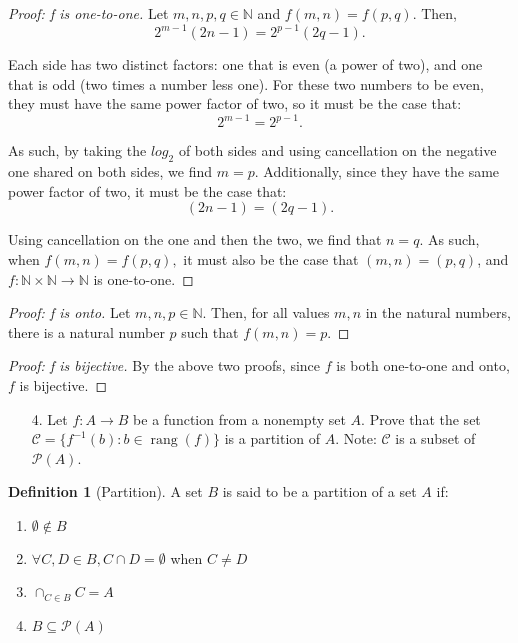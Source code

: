 \documentclass[10pt]{article}
\theoremstyle{definition}
\newtheorem{definition}[equation]{Definition}
\theoremstyle{plain}
\newcommand{\N}{\mathbb{N}}
\DeclareMathOperator\rang{rang}
\begin{document}
\begin{proof}[Proof: f is one-to-one]
  Let $m,n,p,q\in\N$ and $f(m,n)=f(p,q)$. Then,
  $$2^{m-1}(2n-1)=2^{p-1}(2q-1).$$

  Each side has two distinct factors: one that is even (a power of two), and one that is odd (two times a number less one). For these two numbers to be even, they must have the same power factor of two, so it must be the case that:
  $$2^{m-1}=2^{p-1}.$$

  As such, by taking the $log_2$ of both sides and using cancellation on the negative one shared on both sides, we find $m=p$. Additionally, since they have the same power factor of two, it must be the case that:
  $$(2n-1)=(2q-1).$$

  Using cancellation on the one and then the two, we find that $n=q$. As such, when $f(m,n)=f(p,q),$ it must also be the case that $(m,n)=(p,q)$, and $f: \N \times \N \to \N$ is one-to-one.
\end{proof}
\begin{proof}[Proof: f is onto]
  Let $m,n,p\in\N$. Then, for all values $m,n$ in the natural numbers, there is a natural number $p$ such that $f(m,n)=p$.
\end{proof}
\begin{proof}[Proof: f is bijective]
  By the above two proofs, since $f$ is both one-to-one and onto, $f$ is bijective.
\end{proof}

\pagebreak



\begin{enumerate}
\item[4.] Let $f:A \to B$ be a function from a nonempty set $A$.  Prove that the set $ \mathcal{C} = \{f^{-1}(b): b \in \rang(f)\}$ is a partition of $A$.  Note:  $\mathcal{C}$ is a subset of $\mathscr{P}(A)$.
\end{enumerate}



\setcounter{equation}{0}
\begin{definition}[Partition]
  A set $B$ is said to be a partition of a set $A$ if:
  \begin{enumerate}
    \item $\emptyset\not\in B$
    \item $\forall C,D \in B, C\cap D= \emptyset$ when $C\neq D$
    \item $\cap_{C\in B} C = A$
    \item $B\subseteq \mathcal{P}(A)$
  \end{enumerate}
\end{definition}
\end{document}
